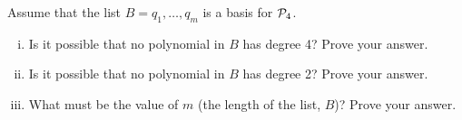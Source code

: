 \begin{question}
	\normalfont
	Assume that the list $B= q_1, \dots, q_m $ \hspace{.1cm} is a basis for $\P_4$.
	\begin{enumerate}[(i)]
		\item Is it possible that no polynomial in $B$ has degree 4? Prove your answer.
		\item Is it possible that no polynomial in $B$ has degree 2? Prove your answer.
		\item What must be the value of $m$ (the length of the list, $B$)?  Prove your answer. \\
	\end{enumerate}
\end{question}